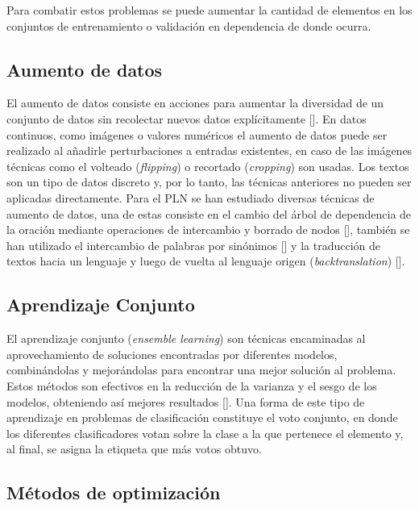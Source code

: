 Para combatir estos problemas se puede aumentar la cantidad de elementos en los conjuntos de entrenamiento o 
validación en dependencia de donde ocurra.

\subsection{Aumento de datos}

El aumento de datos consiste en acciones para aumentar la diversidad de un conjunto de datos sin recolectar
nuevos datos explícitamente [\cite{feng2021data}]. En datos continuos, como imágenes o valores numéricos el 
aumento de datos puede ser realizado al añadirle perturbaciones a entradas existentes, en caso de las imágenes 
técnicas como el volteado (\emph{flipping}) o recortado (\emph{cropping}) son usadas. Los textos son un tipo 
de datos discreto y, por lo tanto, las técnicas anteriores no pueden ser aplicadas directamente. Para el PLN
se han estudiado diversas técnicas de aumento de datos, una de estas consiste en el cambio del árbol de 
dependencia de la oración mediante operaciones de intercambio y borrado de nodos [\cite{csahin2019data}], también se han utilizado 
el intercambio de palabras por sinónimos [\cite{dai2020analysis}] y la traducción de textos hacia un lenguaje y luego 
de vuelta al lenguaje origen (\emph{backtranslation}) [\cite{sennrich2015improving}]. 

\subsection{Aprendizaje Conjunto}

El aprendizaje conjunto (\emph{ensemble learning}) son técnicas encaminadas al aprovechamiento
de soluciones encontradas por diferentes modelos, combinándolas y mejorándolas para encontrar una mejor solución 
al problema. Estos métodos son efectivos en la reducción de la varianza y el sesgo de los modelos, obteniendo así
mejores resultados [\cite{dietterich2002ensemble}]. Una forma de este tipo de aprendizaje en problemas de 
clasificación constituye el voto conjunto, en donde los diferentes clasificadores votan sobre la clase a la que 
pertenece el elemento y, al final, se asigna la etiqueta que más votos obtuvo.

\subsection{Métodos de optimización}

